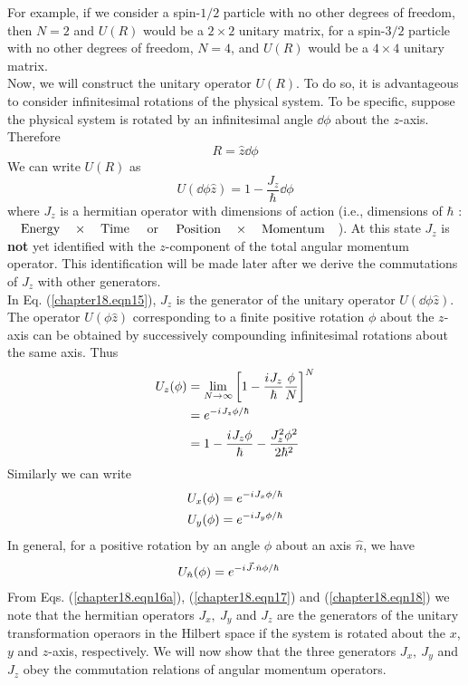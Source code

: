 For example, if we consider a spin-$1/2$ particle with no other degrees of freedom, then $N=2$ and $U(R)$ would be a $2\times 2$ unitary matrix, for a spin-$3/2$ particle with no other degrees of freedom, $N=4$, and $U(R)$ would be a $4\times 4$ unitary matrix.\\


Now, we will construct the unitary operator $U(R)$. To do so, it is advantageous to consider infinitesimal rotations of the physical system. To be specific, suppose the physical system is rotated by an infinitesimal angle $\dd{\phi}$ about the $z$-axis. Therefore
\begin{equation}
R = \hat{z} \dd{\phi}
\end{equation}
We can write $U(R)$ as
\begin{equation}
\label{chapter18.eqn15}
U(\dd{\phi} \hat{z}) = 1 - \frac{J_z}{\hbar} \dd{\phi}
\end{equation}
where $J_z$ is a hermitian operator with dimensions of action (i.e., dimensions of $\hbar$ : $\qq{Energy}\times \qq{Time}$ or $\qq{Position}\times \qq{Momentum}$). At this state $J_z$ is \textbf{not} yet identified with the $z$-component of the total angular momentum operator. This identification will be made later after we derive the commutations of $J_z$ with other generators.\\

In Eq. (\ref{chapter18.eqn15}), $J_z$ is the generator of the unitary operator $U(\dd{\phi} \hat{z})$. The operator $U(\phi \hat{z})$ corresponding to a finite positive rotation $\phi$ about the $z$-axis can be obtained by successively compounding infinitesimal rotations about the same axis. Thus
\begin{align}
U_z(\phi) 
&= \lim\limits_{N \rightarrow \infty} \qty[1 - \frac{{i\mkern1mu} J_z}{\hbar} \frac{\phi}{N}]^N \nonumber\\
\label{chapter18.eqn16a}
&= e^{-{i\mkern1mu} J_z \phi/\hbar} \\
\label{chapter18.eqn16b}
&= 1 - \frac{{i\mkern1mu} J_z \phi}{\hbar} - \frac{J_z^2 \phi^2}{2 \hbar^2}
\end{align}
Similarly we can write
\begin{align}
\label{chapter18.eqn17}
U_x(\phi) &= e^{-{i\mkern1mu} J_x \phi/\hbar} \\
\label{chapter18.eqn18}
U_y(\phi) &= e^{-{i\mkern1mu} J_y \phi/\hbar}
\end{align}
In general, for a positive rotation by an angle $\phi$ about an axis $\hat{n}$, we have
\begin{align}
\label{chapter18.eqn19}
U_{\hat{n}}(\phi) &= e^{-{i\mkern1mu} \vec{J}\cdot\hat{n} \phi/\hbar}
\end{align}
From Eqs. (\ref{chapter18.eqn16a}), (\ref{chapter18.eqn17}) and (\ref{chapter18.eqn18}) we note that the hermitian operators $J_x,\ J_y$ and $J_z$ are the generators of the unitary transformation operaors in the Hilbert space if the system is rotated about the $x$, $y$ and $z$-axis, respectively. We will now show that the three generators $J_x,\ J_y$ and $J_z$ obey the commutation relations of angular momentum operators.



